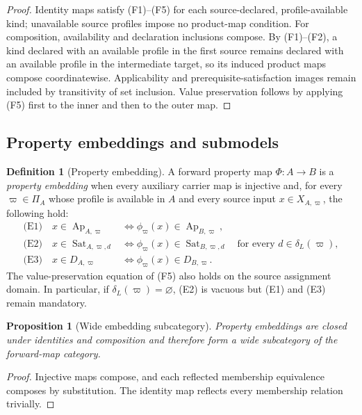 \documentclass[11pt]{article}
\newcommand{\Ap}{\operatorname{Ap}}
\newcommand{\Sat}{\operatorname{Sat}}
\newtheorem{proposition}[theorem]{Proposition}
\theoremstyle{definition}
\newtheorem{definition}[theorem]{Definition}
\theoremstyle{remark}
\begin{document}
\begin{proof}
Identity maps satisfy (F1)--(F5) for each source-declared, profile-available kind; unavailable source profiles impose no product-map condition.
For composition, availability and declaration inclusions compose.
By (F1)--(F2), a kind declared with an available profile in the first source remains declared with an available profile in the intermediate target, so its induced product maps compose coordinatewise.
Applicability and prerequisite-satisfaction images remain included by transitivity of set inclusion.
Value preservation follows by applying (F5) first to the inner and then to the outer map.
\end{proof}

\subsection{Property embeddings and submodels}

\begin{definition}[Property embedding]
A forward property map \(\Phi:A\to B\) is a \emph{property embedding} when every auxiliary carrier map is injective and, for every \(\varpi\in\Pi_A\) whose profile is available in \(A\) and every source input \(x\in X_{A,\varpi}\), the following hold:
\[
\begin{aligned}
\text{(E1)}\quad x\in\Ap_{A,\varpi}
&\Longleftrightarrow
\phi_{\varpi}(x)\in\Ap_{B,\varpi},\\
\text{(E2)}\quad x\in\Sat_{A,\varpi,d}
&\Longleftrightarrow
\phi_{\varpi}(x)\in\Sat_{B,\varpi,d}
\quad\text{for every }d\in\delta_L(\varpi),\\
\text{(E3)}\quad x\in D_{A,\varpi}
&\Longleftrightarrow
\phi_{\varpi}(x)\in D_{B,\varpi}.
\end{aligned}
\]
The value-preservation equation of (F5) also holds on the source assignment domain.
In particular, if \(\delta_L(\varpi)=\varnothing\), (E2) is vacuous but (E1) and (E3) remain mandatory.
\end{definition}

\begin{proposition}[Wide embedding subcategory]
Property embeddings are closed under identities and composition and therefore form a wide subcategory of the forward-map category.
\end{proposition}

\begin{proof}
Injective maps compose, and each reflected membership equivalence composes by substitution.
The identity map reflects every membership relation trivially.
\end{proof}
\end{document}
